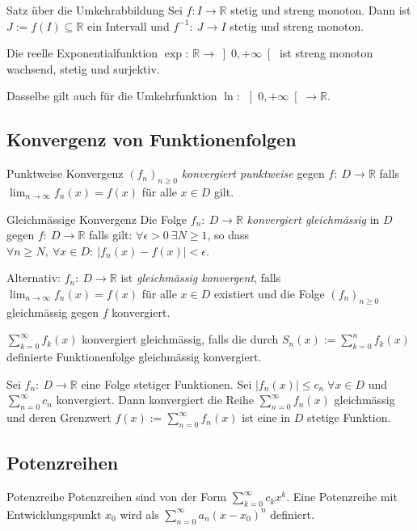 \documentclass[a4paper,10pt]{article}
\def\limn{\lim_{n\to \infty}}
\def\sumn{\sum_{n=0}^\infty}
\def\R{\mathbb{R}}
\begin{document}
\begin{mainbox}{Satz über die Umkehrabbildung}
 Sei $f: I \to \R$ stetig und streng monoton. Dann ist $J := f(I) \subseteq \R$ ein Intervall und $f^{-1}: \: J \to I$ stetig und streng monoton.
\end{mainbox}

\begin{subbox}{Die reelle Exponentialfunktion}
 $\exp: \: \R \to \left] 0,+\infty \right[$ ist streng monoton wachsend, stetig und surjektiv.
 
 Dasselbe gilt auch für die Umkehrfunktion $\ln: \: \left] 0,+\infty \right[ \to \R$.
\end{subbox}

\subsection{Konvergenz von Funktionenfolgen}

\begin{mainbox}{Punktweise Konvergenz}
  $(f_n)_{n \geq 0}$ \emph{konvergiert punktweise} gegen $f: \: D \to \R$ falls $\limn f_n(x) = f(x)$ für alle $x \in D$ gilt.
\end{mainbox}

\begin{mainbox}{Gleichmässige Konvergenz}
 Die Folge $f_n : \: D \to \R$ \emph{konvergiert gleichmässig} in $D$ gegen $f: \: D \to \R$ falls gilt: $\forall \epsilon > 0 \ \exists N \ge 1$, so dass $\forall n \ge N, \ \forall x \in D: \: | f_n(x) - f(x) | < \epsilon$.
 
 Alternativ: $f_n: \: D \to \R$ ist \emph{gleichmässig konvergent}, falls $\limn f_n(x) = f(x)$ für alle $x\in D$ existiert und die Folge $(f_n)_{n \geq 0}$ gleichmässig gegen $f$ konvergiert.
\end{mainbox}
$\sum_{k=0}^\infty f_k(x)$ konvergiert gleichmässig, falls die durch $S_n(x) := \sum_{k=0}^n f_k(x)$ definierte Funktionenfolge gleichmässig konvergiert.

\begin{subbox}{}
 Sei $f_n: \: D \to \R$ eine Folge stetiger Funktionen. Sei $|f_n(x)| \le c_n \; \forall x \in D$ und $\sum_{n=0}^\infty c_n$ konvergiert. Dann konvergiert die Reihe $\sum_{n=0}^\infty f_n(x)$ gleichmässig und deren Grenzwert $f(x) := \sumn{f_n(x)}$ ist eine in $D$ stetige Funktion.
\end{subbox}

\subsection{Potenzreihen}
\begin{subbox}{Potenzreihe}
 Potenzreihen sind von der Form $\sum_{k=0}^\infty c_k x^k$. Eine Potenzreihe mit Entwicklungspunkt $x_0$ wird als $\sum_{n=0}^\infty a_n(x-x_0)^n$ definiert.
\end{subbox}
\end{document}
